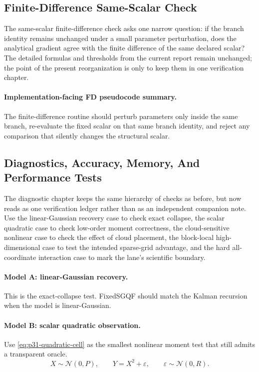 \documentclass[11pt]{article}
\numberwithin{equation}{section}
\newcommand{\N}{\mathcal N}
\begin{document}
\subsection{Finite-Difference Same-Scalar Check}
\label{subsec:p31-finite-difference}

The same-scalar finite-difference check asks one narrow question: if the branch
identity remains unchanged under a small parameter perturbation, does the
analytical gradient agree with the finite difference of the same declared scalar?
The detailed formulas and thresholds from the current report remain unchanged; the
point of the present reorganization is only to keep them in one verification
chapter.

\paragraph{Implementation-facing FD pseudocode summary.}
The finite-difference routine should perturb parameters only inside the same
branch, re-evaluate the fixed scalar on that same branch identity, and reject any
comparison that silently changes the structural scalar.

\subsection{Diagnostics, Accuracy, Memory, And Performance Tests}
\label{sec:p31-validation}

The diagnostic chapter keeps the same hierarchy of checks as before, but now reads
as one verification ledger rather than as an independent companion note.  Use the
linear-Gaussian recovery case to check exact collapse, the scalar quadratic case
to check low-order moment correctness, the cloud-sensitive nonlinear case to check
the effect of cloud placement, the block-local high-dimensional case to test the
intended sparse-grid advantage, and the hard all-coordinate interaction case to
mark the lane's scientific boundary.

\paragraph{Model A: linear-Gaussian recovery.}
This is the exact-collapse test.  FixedSGQF should match the Kalman recursion when
the model is linear-Gaussian.

\paragraph{Model B: scalar quadratic observation.}
Use \eqref{eq:p31-quadratic-cell} as the smallest nonlinear moment test that still
admits a transparent oracle.
\begin{equation}
  X\sim\N(0,P),\qquad Y=X^2+\varepsilon,\qquad
  \varepsilon\sim\N(0,R).
  \label{eq:p31-quadratic-cell}
\end{equation}
\end{document}
